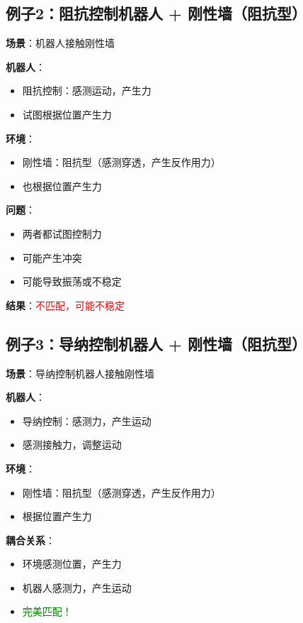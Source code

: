 \documentclass[12pt,a4paper]{article}
\begin{document}
\subsection{例子2：阻抗控制机器人 + 刚性墙（阻抗型）}

\textbf{场景}：机器人接触刚性墙

\textbf{机器人}：
\begin{itemize}
\item 阻抗控制：感测运动，产生力
\item 试图根据位置产生力
\end{itemize}

\textbf{环境}：
\begin{itemize}
\item 刚性墙：阻抗型（感测穿透，产生反作用力）
\item 也根据位置产生力
\end{itemize}

\textbf{问题}：
\begin{itemize}
\item 两者都试图控制力
\item 可能产生冲突
\item 可能导致振荡或不稳定
\end{itemize}

\textbf{结果}：\textcolor{red}{不匹配，可能不稳定}

\subsection{例子3：导纳控制机器人 + 刚性墙（阻抗型）}

\textbf{场景}：导纳控制机器人接触刚性墙

\textbf{机器人}：
\begin{itemize}
\item 导纳控制：感测力，产生运动
\item 感测接触力，调整运动
\end{itemize}

\textbf{环境}：
\begin{itemize}
\item 刚性墙：阻抗型（感测穿透，产生反作用力）
\item 根据位置产生力
\end{itemize}

\textbf{耦合关系}：
\begin{itemize}
\item 环境感测位置，产生力
\item 机器人感测力，产生运动
\item \textcolor{green}{完美匹配！}
\end{itemize}
\end{document}
